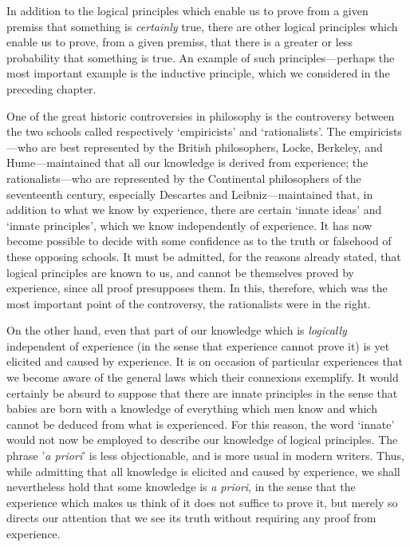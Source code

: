 \documentclass[oneside,letterpaper,12pt]{book}
\begin{document}
In addition to the logical principles which enable us to prove from a
given premiss that something is \emph{certainly} true, there are other
logical principles which enable us to prove, from a given premiss, that
there is a greater or less probability that something is true. \label{induction} An
example of such principles---perhaps the most important example is the
inductive principle, which we considered in the preceding chapter.

One of the great historic controversies in philosophy is the controversy
between the two schools called respectively
`empiricists' and
`rationalists'. The empiricists---who are
best represented by the British philosophers, Locke, Berkeley, and
Hume---maintained that all our knowledge is derived from experience; the
rationalists---who are represented by the Continental philosophers of
the seventeenth century, especially Descartes and Leibniz---maintained
that, in addition to what we know by experience, there are certain
`innate ideas' and
`innate principles', which we know
independently of experience. It has now become possible to decide with
some confidence as to the truth or falsehood of these opposing schools.
\label{rationalists} It must be admitted, for the reasons already stated, that logical
principles are known to us, and cannot be themselves proved by
experience, since all proof presupposes them. In this, therefore, which
was the most important point of the controversy, the rationalists were
in the right.

On the other hand, even that part of our knowledge which is
\emph{logically} independent of experience (in the sense that experience
cannot prove it) is yet elicited and caused by experience. It is on
occasion of particular experiences that we become aware of the general
laws which their connexions exemplify. It would certainly be absurd to
suppose that there are innate principles in the sense that babies are
born with a knowledge of everything which men know and which cannot be
deduced from what is experienced. For this reason, the word
`innate' would not now be employed to
describe our knowledge of logical principles. The phrase
'\emph{a priori}' is less
objectionable, and is more usual in modern writers. Thus, while
admitting that all knowledge is elicited and caused by experience, we
shall nevertheless hold that some knowledge is \emph{a priori}, in the
sense that the experience which makes us think of it does not suffice to
prove it, but merely so directs our attention that we see its truth
without requiring any proof from experience.
\end{document}
